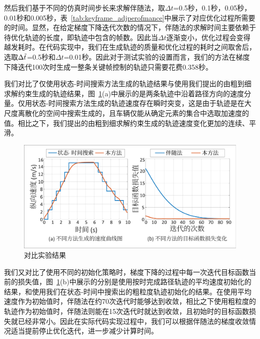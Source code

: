 然后我们基于不同的仿真时间步长来求解伴随法，取$\Delta{t}$=0.5秒，0.1秒，0.05秒，0.01秒和0.005秒，表~\ref{tab:keyframe_adjperofmance}中展示了对应优化过程所需要的时间。显然，在给定梯度下降迭代次数的情况下，伴随法的求解时间主要依赖于待优化轨迹的长度，即轨迹中包含的帧数。因此当$\Delta{t}$逐渐变小，优化过程会变得越发耗时。在代码实现中，我们在生成轨迹的质量和优化过程的耗时之间取舍后，选取$\Delta{\Tilde{t}}$=0.5秒和$\Delta{t}$=0.01秒。因此对于测试实验的设置而言，我们的方法在梯度下降迭代100次时生成一整条关键帧控制的轨迹只需要花费0.358秒。


我们对比了仅使用状态-时间搜索方法生成的轨迹结果与使用我们提出的由粗到细求解约束生成的轨迹结果，图~\ref{fig:keyframe_comparison}(a)中展示的是两条轨迹中沿着路径方向的速度分量。仅用状态-时间搜索方法生成的轨迹速度存在瞬时突变，这是由于轨迹是在大尺度离散化的空间中搜索生成的，且车辆仅能从确定元素的集合中选取加速度的值。相比之下，我们提出的由粗到细求解约束生成的轨迹速度变化更加的连续、平滑。

\begin{figure}[!tbh]
\centering
\includegraphics[width=0.85\columnwidth]{figure/keyframe/comparisons_v3_cn.pdf}
\caption[对比实验结果]{
对比实验结果
}
\label{fig:keyframe_comparison}
\end{figure}

我们又对比了使用不同的初始化策略时，梯度下降的过程中每一次迭代目标函数当前的损失值，图~\ref{fig:keyframe_comparison}(b)中展示的分别是使用按时完成路径轨迹的平均速度初始化的结果，和使用我们在状态-时间中搜索出的粗粒度轨迹初始化的结果。在使用平均速度作为初始值时，伴随法在约70次迭代时能够达到收敛，相比之下使用粗粒度的轨迹作为初始值时，伴随法则能在15次迭代时就达到收敛，且初始时的目标函数损失就已经非常小。因此在实际代码实现过程中，我们可以根据伴随法的梯度收敛情况适当提前停止优化迭代，进一步减少计算时间。



